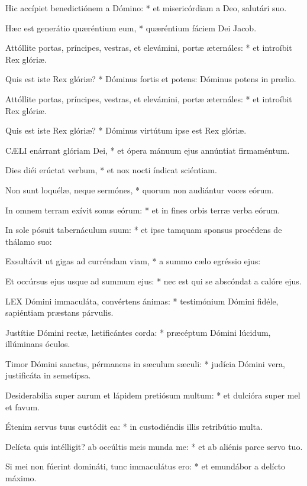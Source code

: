 Hic accípiet benedictiónem a Dómino: * et misericórdiam a Deo, salutári suo.

Hæc est generátio quæréntium eum, * quæréntium fáciem Dei Jacob.

Attóllite portas, príncipes, vestras, et elevámini, portæ æternáles: * et introíbit Rex glóriæ.

Quis est iste Rex glóriæ? * Dóminus fortis et potens: Dóminus potens in prœlio.

Attóllite portas, príncipes, vestras, et elevámini, portæ æternáles: * et introíbit Rex glóriæ.

Quis est iste Rex glóriæ? * Dóminus virtútum ipse est Rex glóriæ.


\lettrine[lines=2]{C}{ÆLI} enárrant glóriam Dei, * et ópera mánuum ejus annúntiat firmaméntum.

Dies diéi erúctat verbum, * et nox nocti índicat sciéntiam.

Non sunt loquélæ, neque sermónes, * quorum non audiántur voces eórum.

In omnem terram exívit sonus eórum: * et in fines orbis terræ verba eórum.

In sole pósuit tabernáculum suum: * et ipse tamquam sponsus procédens de thálamo suo:

Exsultávit ut gigas ad curréndam viam, * a summo cælo egréssio ejus:

Et occúrsus ejus usque ad summum ejus: * nec est qui se abscóndat a calóre ejus.


\lettrine[lines=2]{L}{EX} Dómini immaculáta, convértens ánimas: * testimónium Dómini fidéle, sapiéntiam præstans párvulis.

Justítiæ Dómini rectæ, lætificántes corda: * præcéptum Dómini lúcidum, illúminans óculos.

Timor Dómini sanctus, pérmanens in sæculum sæculi: * judícia Dómini vera, justificáta in semetípsa.

Desiderabília super aurum et lápidem pretiósum multum: * et dulcióra super mel et favum.

Étenim servus tuus custódit ea: * in custodiéndis illis retribútio multa.

Delícta quis intélligit? ab occúltis meis munda me: * et ab aliénis parce servo tuo.

Si mei non fúerint domináti, tunc immaculátus ero: * et emundábor a delícto máximo.

